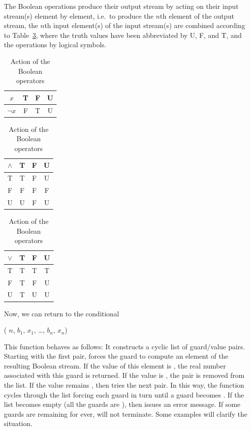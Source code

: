 \documentclass[a4paper,12pt]{article}
\newenvironment{funlist}{\begin{list}%
   {}%
   {\topsep=0pt%
        \leftmargin=0cm%
        \rightmargin=0cm%
        \listparindent=0cm%
        \parskip=10pt%
        \partopsep=0pt%
        \itemsep=0pt%
        \parsep=0pt}}%
   {\end{list}}
\begin{document}
The Boolean operations produce their output stream by acting
on their input stream(s) element by element,
i.e.\ to produce the $n$th element of the output stream,
the $n$th input element(s) of the input stream(s) are combined
according to Table~\ref{op-action},
where the truth values have been abbreviated by U, F, and T,
and the operations by logical symbols.

\begin{table}[htp]
\begin{center}
\begin{tabular}{c|ccc}
$x$      & T & F & U \\
\hline
$\neg x$ & F & T & U
\end{tabular}\hspace{2em}
\begin{tabular}{c|ccc}
$\land$  & T & F & U \\
\hline
      T  & T & F & U \\
      F  & F & F & F \\
      U  & U & F & U
\end{tabular}\hspace{2em}
\begin{tabular}{c|ccc}
$\lor$   & T & F & U \\
\hline
      T  & T & T & T \\
      F  & T & F & U \\
      U  & T & U & U
\end{tabular}
\end{center}
\caption{Action of the Boolean operators}\label{op-action}
\end{table}

Now, we can return to the conditional
\begin{funlist}
\item {} (%
  $n$,
 $b_1$,
 $x_1$, 
\ldots,
 $b_n$,
 $x_n$) 
\end{funlist}
This function behaves as follows:
It constructs a cyclic list of guard/value pairs.
Starting with the first pair,  forces the guard
to compute an element of the resulting Boolean stream.
If the value of this element is ,
the real number associated with this guard is returned.
If the value is , the pair is removed from the list.
If the value remains , then  tries the next pair.
In this way, the function cycles through the list forcing each guard in turn
until a guard becomes .
If the list becomes empty (all the guards are ),
then  issues an error message.
If some guards are remaining  for ever,
 will not terminate.
Some examples will clarify the situation.
\end{document}
